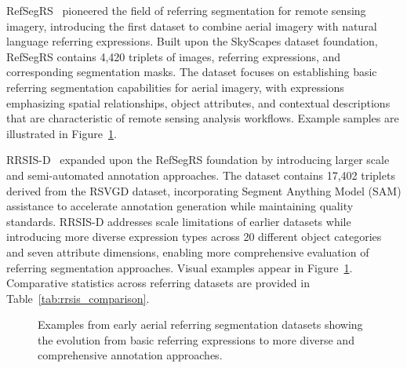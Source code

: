 RefSegRS~\cite{chen2025rsrefseg} pioneered the field of referring segmentation for remote sensing imagery, introducing the first dataset to combine aerial imagery with natural language referring expressions. Built upon the SkyScapes dataset foundation, RefSegRS contains 4,420 triplets of images, referring expressions, and corresponding segmentation masks. The dataset focuses on establishing basic referring segmentation capabilities for aerial imagery, with expressions emphasizing spatial relationships, object attributes, and contextual descriptions that are characteristic of remote sensing analysis workflows. Example samples are illustrated in Figure~\ref{fig:aerial_datasets}.

RRSIS-D~\cite{yuan2023rrsis} expanded upon the RefSegRS foundation by introducing larger scale and semi-automated annotation approaches. The dataset contains 17,402 triplets derived from the RSVGD dataset, incorporating Segment Anything Model (SAM) assistance to accelerate annotation generation while maintaining quality standards. RRSIS-D addresses scale limitations of earlier datasets while introducing more diverse expression types across 20 different object categories and seven attribute dimensions, enabling more comprehensive evaluation of referring segmentation approaches. Visual examples appear in Figure~\ref{fig:aerial_datasets}. Comparative statistics across referring datasets are provided in Table~\ref{tab:rrsis_comparison}.

\begin{figure}[htbp]
\centering
{}
\hfill
{}
\caption{Examples from early aerial referring segmentation datasets showing the evolution from basic referring expressions to more diverse and comprehensive annotation approaches.}
\label{fig:aerial_datasets}
\end{figure}

